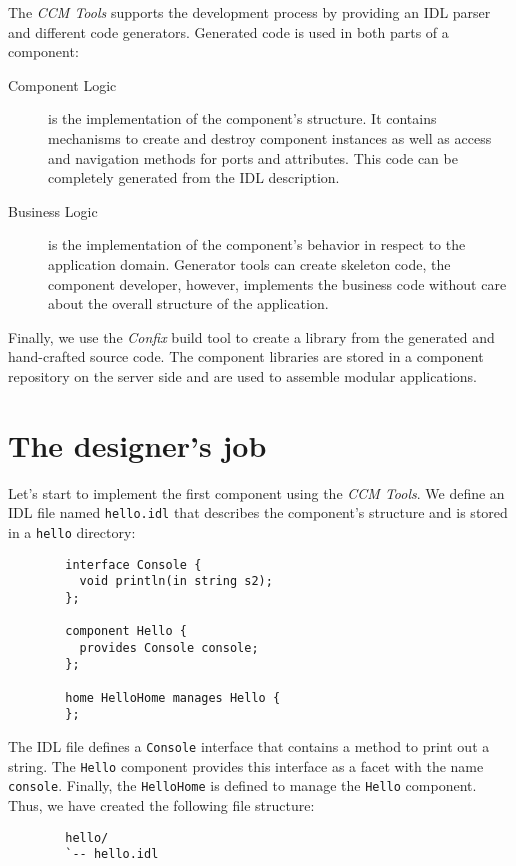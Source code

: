 The {\it CCM Tools} supports the development process by providing an IDL parser
and different code generators.
Generated code is used in both parts of a component:
\begin{description}
\item [Component Logic] is the implementation of the component's structure.
It contains mechanisms to create and destroy component instances as well as access
and navigation methods for ports and attributes.
This code can be completely generated from the IDL description. 
\item [Business Logic] is the implementation of the component's behavior in respect 
to the application domain. 
Generator tools can create skeleton code, the component developer, however, 
implements the business code without care about the overall structure of the application.
\end{description}

Finally, we use the {\it Confix} build tool to create a library from the generated and
hand-crafted source code. The component libraries are stored in a component repository on the
server side and are used to assemble modular applications.

  

\section{The designer's job}

Let's start to implement the first component using the {\it CCM Tools}.
We define an IDL file named {\tt hello.idl} that describes the component's structure
and is stored in a {\tt hello} directory:
\begin{verbatim}
        interface Console {
          void println(in string s2);
        };

        component Hello {
          provides Console console;
        };

        home HelloHome manages Hello {
        };
\end{verbatim}

The IDL file  defines a {\tt Console} interface that contains a method to print 
out a string. 
The {\tt Hello} component provides this interface as a facet with the name {\tt console}.
Finally, the {\tt HelloHome} is defined to manage the {\tt Hello} component.
Thus, we have created the following file structure:  
\begin{verbatim}
        hello/
        `-- hello.idl
\end{verbatim}

